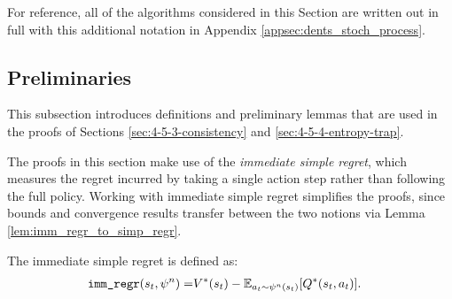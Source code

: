     For reference, all of the algorithms considered in this Section are written out in full with this additional notation in Appendix \ref{appsec:dents_stoch_process}. 








    

    
    

    




















\subsection{Preliminaries}
\label{sec:4-5-2-prelim}

    This subsection introduces definitions and preliminary lemmas that are used in the proofs of Sections \ref{sec:4-5-3-consistency} and \ref{sec:4-5-4-entropy-trap}.







    The proofs in this section make use of the \textit{immediate simple regret}, which measures the regret incurred by taking a single action step rather than following the full policy. Working with immediate simple regret simplifies the proofs, since bounds and convergence results transfer between the two notions via Lemma \ref{lem:imm_regr_to_simp_regr}.
    \begin{defn}
        \label{def:4:immediate_simple_regret}
        The \textnormal{immediate simple regret} is defined as:
        \begin{align}
            {\textnormal{\texttt{imm\_regr}}}(s_t,\psi^n) =& V^*(s_t) - \mathbb{E}_{a_t\sim\psi^n(s_t)}[Q^*(s_t,a_t)].
        \end{align}
    \end{defn}



